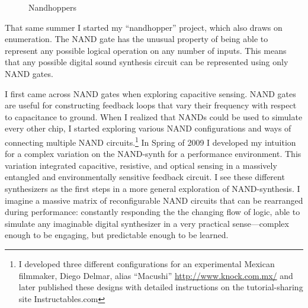 \documentclass{thesis}
\begin{document}
\begin{figure}
\begin{center}
	  \caption{Nandhoppers}
	  \label{nandhoppers}
  \end{center}
\end{figure}

That same summer I started my ``nandhopper'' project\cite{kyle_mcdonald_nandhopper_2008}, which also draws on enumeration. The NAND gate has the unusual property of being able to represent any possible logical operation on any number of inputs. This means that any possible digital sound synthesis circuit can be represented using only NAND gates.
	
I first came across NAND gates when exploring capacitive sensing. NAND gates are useful for constructing feedback loops that vary their frequency with respect to capacitance to ground. When I realized that NANDs could be used to simulate every other chip, I started exploring various NAND configurations and ways of connecting multiple NAND circuits.\footnote{I developed three different configurations for an experimental Mexican filmmaker, Diego Delmar, alias ``Macushi'' \url{http://www.knock.com.mx/} and later published these designs with detailed instructions on the tutorial-sharing site Instructables.com} In Spring of 2009 I developed my intuition for a complex variation on the NAND-synth for a performance environment. This variation integrated capacitive, resistive, and optical sensing in a massively entangled and environmentally sensitive feedback circuit. I see these different synthesizers as the first steps in a more general exploration of NAND-synthesis. I imagine a massive matrix of reconfigurable NAND circuits that can be rearranged during performance: constantly responding the the changing flow of logic, able to simulate any imaginable digital synthesizer in a very practical sense---complex enough to be engaging, but predictable enough to be learned.
\end{document}

